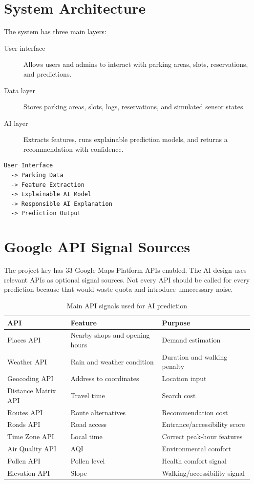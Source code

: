 \documentclass[12pt,a4paper]{article}
\begin{document}
\section{System Architecture}
\label{sec:architecture}

The system has three main layers:

\begin{description}
  \item[User interface] Allows users and admins to interact with parking areas, slots, reservations, and predictions.
  \item[Data layer] Stores parking areas, slots, logs, reservations, and simulated sensor states.
  \item[AI layer] Extracts features, runs explainable prediction models, and returns a recommendation with confidence.
\end{description}

\begin{lstlisting}
User Interface
  -> Parking Data
  -> Feature Extraction
  -> Explainable AI Model
  -> Responsible AI Explanation
  -> Prediction Output
\end{lstlisting}

\section{Google API Signal Sources}
\label{sec:api-sources}

The project key has 33 Google Maps Platform APIs enabled. The AI design uses relevant APIs as optional signal sources. Not every API should be called for every prediction because that would waste quota and introduce unnecessary noise.

\begin{table}[h]
  \centering
  \caption{Main API signals used for AI prediction}
  \label{tab:api-signals}
  \begin{tabular}{p{}p{}p{}}
    \toprule
    API & Feature & Purpose \\
    \midrule
    Places API & Nearby shops and opening hours & Demand estimation \\
    Weather API & Rain and weather condition & Duration and walking penalty \\
    Geocoding API & Address to coordinates & Location input \\
    Distance Matrix API & Travel time & Search cost \\
    Routes API & Route alternatives & Recommendation cost \\
    Roads API & Road access & Entrance/accessibility score \\
    Time Zone API & Local time & Correct peak-hour features \\
    Air Quality API & AQI & Environmental comfort \\
    Pollen API & Pollen level & Health comfort signal \\
    Elevation API & Slope & Walking/accessibility signal \\
    \bottomrule
  \end{tabular}
\end{table}
\end{document}
